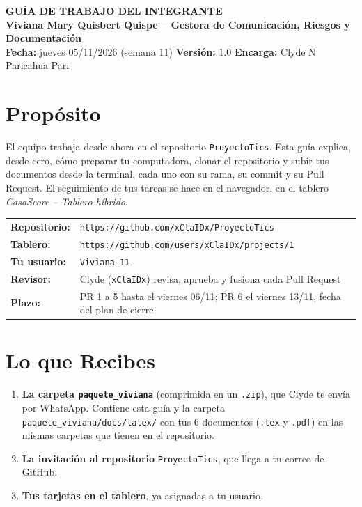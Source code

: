 \documentclass[11pt,a4paper]{article}
\begin{document}
\shorthandoff{<>}
\begin{center}
    {\Large \textbf{\textcolor{AzulUNA}{GUÍA DE TRABAJO DEL INTEGRANTE}}}\\[3pt]
    {\normalsize \textbf{Viviana Mary Quisbert Quispe -- Gestora de Comunicación, Riesgos y Documentación}}\\[4pt]
    \footnotesize \textbf{Fecha:} jueves 05/11/2026 (semana 11) \quad \textbar\quad \textbf{Versión:} 1.0 \quad \textbar\quad \textbf{Encarga:} Clyde N. Paricahua Pari
\end{center}

\vspace{0.1cm}

\section{Propósito}
El equipo trabaja desde ahora en el repositorio \texttt{ProyectoTics}. Esta guía explica, desde cero, cómo preparar tu computadora, clonar el repositorio y subir tus documentos desde la terminal, cada uno con su rama, su commit y su Pull Request. El seguimiento de tus tareas se hace en el navegador, en el tablero \textit{CasaScore -- Tablero híbrido}.

\vspace{0.1cm}
\noindent\begin{tabularx}{\textwidth}{@{}P{3.6cm} L@{}}
\toprule
\textbf{Repositorio:} & \nolinkurl{https://github.com/xClaIDx/ProyectoTics} \\
\textbf{Tablero:} & \nolinkurl{https://github.com/users/xClaIDx/projects/1} \\
\textbf{Tu usuario:} & \texttt{Viviana-11} \\
\textbf{Revisor:} & Clyde (\texttt{xClaIDx}) revisa, aprueba y fusiona cada Pull Request \\
\textbf{Plazo:} & PR 1 a 5 hasta el viernes 06/11; PR 6 el viernes 13/11, fecha del plan de cierre \\
\bottomrule
\end{tabularx}

\section{Lo que Recibes}
\begin{enumerate}[leftmargin=*]
    \item \textbf{La carpeta \texttt{paquete\_viviana}} (comprimida en un \texttt{.zip}), que Clyde te envía por WhatsApp. Contiene esta guía y la carpeta \nolinkurl{paquete_viviana/docs/latex/} con tus 6 documentos (\texttt{.tex} y \texttt{.pdf}) en las mismas carpetas que tienen en el repositorio.
    \item \textbf{La invitación al repositorio} \texttt{ProyectoTics}, que llega a tu correo de GitHub.
    \item \textbf{Tus tarjetas en el tablero}, ya asignadas a tu usuario.
\end{enumerate}
\end{document}
